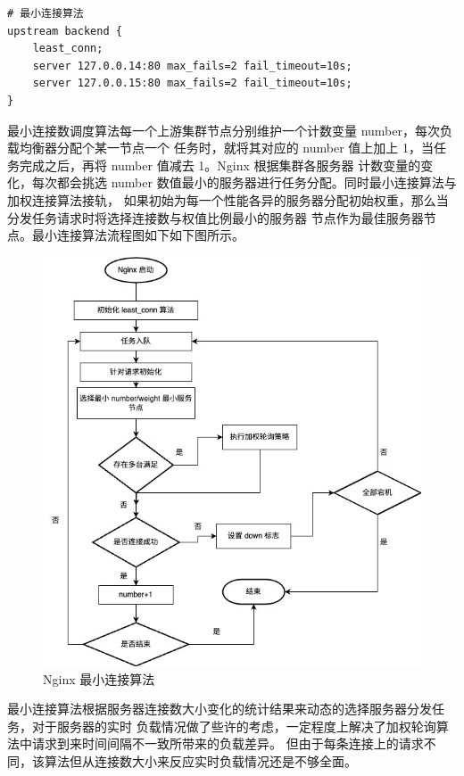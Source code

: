 \begin{lstlisting}
# 最小连接算法
upstream backend {
    least_conn;
    server 127.0.0.14:80 max_fails=2 fail_timeout=10s;
    server 127.0.0.15:80 max_fails=2 fail_timeout=10s;
}
\end{lstlisting}

最小连接数调度算法每一个上游集群节点分别维护一个计数变量 number，每次负载均衡器分配个某一节点一个
任务时，就将其对应的 number 值上加上 1，当任务完成之后，再将 number 值减去 1。Nginx 根据集群各服务器
计数变量的变化，每次都会挑选 number 数值最小的服务器进行任务分配。同时最小连接算法与加权连接算法接轨，
如果初始为每一个性能各异的服务器分配初始权重，那么当分发任务请求时将选择连接数与权值比例最小的服务器
节点作为最佳服务器节点。最小连接算法流程图如下如下图所示。

\begin{figure}[htb]
  \centering
  \includegraphics[width=\textwidth]{figures/least-flowchart.jpg}
  \caption{Nginx 最小连接算法}
\end{figure}

最小连接算法根据服务器连接数大小变化的统计结果来动态的选择服务器分发任务，对于服务器的实时
负载情况做了些许的考虑，一定程度上解决了加权轮询算法中请求到来时间间隔不一致所带来的负载差异。
但由于每条连接上的请求不同，该算法但从连接数大小来反应实时负载情况还是不够全面。

